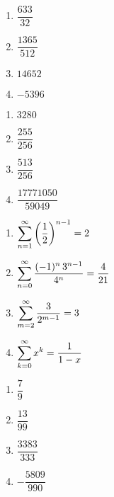 \documentclass{ximera}
\begin{document}
\begin{multicols}{4}
\begin{enumerate}
\setcounter{enumi}{\value{HW}}

\item $\dfrac{633}{32}$

\item $\dfrac{1365}{512}$

\item  $14652$

\item  $-5396$

\setcounter{HW}{\value{enumi}}
\end{enumerate}
\end{multicols}

\begin{multicols}{4}
\begin{enumerate}
\setcounter{enumi}{\value{HW}}

\item  $3280$

\item  $\dfrac{255}{256}$



\item $\dfrac{513}{256}$

\item $\dfrac{17771050}{59049}$

\setcounter{HW}{\value{enumi}}
\end{enumerate}
\end{multicols}

\begin{multicols}{4}
\begin{enumerate}
\setcounter{enumi}{\value{HW}}

\item $\displaystyle{ \sum_{n = 1}^{\infty} \left( \frac{1}{2} \right)^{n-1} = 2}$  
\item $\displaystyle{ \sum_{n = 0}^{\infty}  \dfrac{(-1)^n \, 3^{n-1}}{4^{n}} = \frac{4}{21}}$ 
\item $\displaystyle{ \sum_{m = 2}^{\infty}   \dfrac{3}{2^{m-1}} = 3}$ 
\item $\displaystyle{ \sum_{k =0}^{\infty}  x^{k} = \frac{1}{1-x}}$
\setcounter{HW}{\value{enumi}}
\end{enumerate}
\end{multicols}



\begin{multicols}{4}
\begin{enumerate}
\setcounter{enumi}{\value{HW}}



\item $\dfrac{7}{9}$

\item $\dfrac{13}{99}$


\item $\dfrac{3383}{333}$
\item $-\dfrac{5809}{990}$

\setcounter{HW}{\value{enumi}}
\end{enumerate}
\end{multicols}
\end{document}
